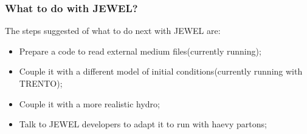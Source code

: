 \documentclass{beamer}
\begin{document}
\begin{frame}\frametitle{What to do with JEWEL?}
	The steps suggested of what to do next with JEWEL are:
	\begin{itemize}
	\pause
	\item Prepare a code to read external medium files(currently running);
	\pause
	\item Couple it with a different model of initial conditions(currently running with TRENTO);
	\pause
	\item Couple it with a more realistic hydro;
	\pause
	\item Talk to JEWEL developers to adapt it to run with haevy partons;
	\end{itemize}
\end{frame}
\end{document}

